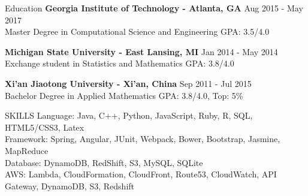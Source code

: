 \documentclass{resume} %
\begin{document}
\begin{rSection}{Education}
{\bf Georgia Institute of Technology {\normalfont -  Atlanta, GA}} \hfill { Aug 2015 - May 2017} \\ 
{Master Degree in Computational Science and Engineering} \hfill { GPA: 3.5/4.0}

%

{\bf Michigan State University {\normalfont -   East Lansing, MI}} \hfill { Jan 2014 - May 2014} \\ 
{ Exchange student in Statistics and Mathematics} \hfill { GPA: 3.8/4.0}

{\bf Xi'an Jiaotong University {\normalfont  -   Xi'an, China}} \hfill { Sep 2011 - Jul 2015} \\ 
{ Bachelor Degree in Applied Mathematics} \hfill { GPA: 3.8/4.0, Top: 5\%}

\end{rSection}



\begin{rSection}{SKILLS}
	Language: Java, C{\ttfamily ++}, Python, JavaScript, Ruby, R, SQL, HTML5/CSS3, Latex\\
	Framework: Spring, Angular, JUnit, Webpack, Bower, Bootstrap, Jasmine, MapReduce \\
	Database: DynamoDB, RedShift, S3, MySQL, SQLite\\
	AWS:  Lambda, CloudFormation, CloudFront, Route53, CloudWatch, API Gateway, DynamoDB, S3, Redshift
\end{rSection}
\end{document}
